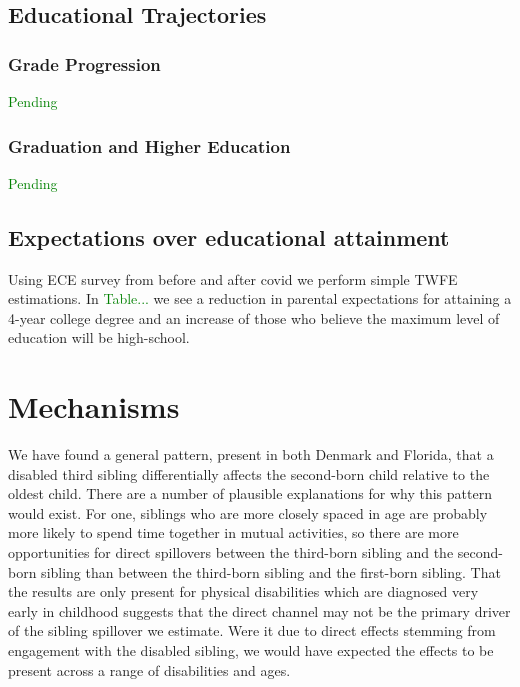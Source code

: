 \subsection{Educational Trajectories}

\subsubsection{Grade Progression}

\textcolor{green}{Pending}

\subsubsection{Graduation and Higher Education}

\textcolor{green}{Pending}

\subsection{Expectations over educational attainment}

Using ECE survey from before and after covid we perform simple TWFE estimations. In \textcolor{green}{Table...} we see a reduction in parental expectations for attaining a 4-year college degree and an increase of those who believe the maximum level of education will be high-school.


\section{Mechanisms}\label{sec:mechanisms}

We have found a general pattern, present in both Denmark and Florida, that a disabled third sibling differentially affects the second-born child relative to the oldest child. There are a number of plausible explanations for why this pattern would exist. For one, siblings who are more closely spaced in age are probably more likely to spend time together in mutual activities, so there are more opportunities for direct spillovers between the third-born sibling and the second-born sibling than between the third-born sibling and the first-born sibling. That the results are only present for physical disabilities which are diagnosed very early in childhood suggests that the direct channel may not be the primary driver of the sibling spillover we estimate. Were it due to direct effects stemming from engagement with the disabled sibling, we would have expected the effects to be present across a range of disabilities and ages.

